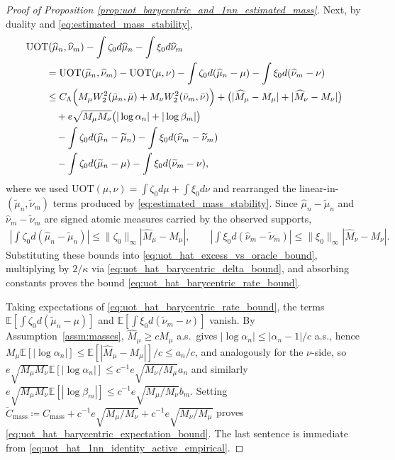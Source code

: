 \documentclass[11pt,reqno]{amsart}
\theoremstyle{definition}
\renewcommand{\hat}{\widehat}
\renewcommand{\tilde}{\widetilde}
\newcommand{\Ep}{\mathbb{E}}
\begin{document}
\begin{proof}[Proof of Proposition \ref{prop:uot_barycentric_and_1nn_estimated_mass}]
Next, by duality and \eqref{eq:estimated_mass_stability},
\begin{align}
\label{eq:uot_hat_excess_vs_oracle_bound}
\begin{aligned}
&\mathrm{UOT}(\hat\mu_n,\hat\nu_m)
- \int \zeta_0   d\hat\mu_n
- \int \xi_0   d\hat\nu_m \\
&\qquad=
\mathrm{UOT}(\hat\mu_n,\hat\nu_m)-\mathrm{UOT}(\mu,\nu)
- \int \zeta_0   d(\hat\mu_n-\mu)
- \int \xi_0   d(\hat\nu_m-\nu) \\
&\qquad\le
C_\Lambda\Bigl(
    M_\mu W_2^2(\bar\mu_n,\bar\mu)+M_\nu W_2^2(\bar\nu_m,\bar\nu)
\Bigr)
+ \bigl( |\hat M_\mu-M_\mu|+|\hat M_\nu-M_\nu| \bigr) \\
&\qquad\quad
+ e\sqrt{M_\mu M_\nu}\bigl(|\log\alpha_n|+|\log\beta_m|\bigr) \\
&\qquad\quad
- \int \zeta_0   d(\hat\mu_n-\tilde\mu_n)
- \int \xi_0   d(\hat\nu_m-\tilde\nu_m) \\
&\qquad\quad
- \int \zeta_0   d(\tilde\mu_n-\mu)
- \int \xi_0   d(\tilde\nu_m-\nu),
\end{aligned}
\end{align}
where we used $\mathrm{UOT}(\mu,\nu)=\int\zeta_0 d\mu+\int\xi_0 d\nu$ and rearranged the linear-in-$(\tilde\mu_n,\tilde\nu_m)$ terms produced by \eqref{eq:estimated_mass_stability}.
Since $\hat\mu_n-\tilde\mu_n$ and $\hat\nu_m-\tilde\nu_m$ are signed atomic measures carried by the observed supports,
\begin{align}
    \left|
        \int \zeta_0   d(\hat\mu_n-\tilde\mu_n)
    \right|
    \le
    \|\zeta_0\|_\infty |\hat M_\mu-M_\mu|,
    \qquad
    \left|
        \int \xi_0   d(\hat\nu_m-\tilde\nu_m)
    \right|
    \le
    \|\xi_0\|_\infty |\hat M_\nu-M_\nu|.
\end{align}
Substituting these bounds into \eqref{eq:uot_hat_excess_vs_oracle_bound}, multiplying by $2/\kappa$ via \eqref{eq:uot_hat_barycentric_delta_bound}, and absorbing constants proves the bound \eqref{eq:uot_hat_barycentric_rate_bound}.

Taking expectations of \eqref{eq:uot_hat_barycentric_rate_bound}, the terms $\Ep[\int\zeta_0 d(\tilde\mu_n-\mu)]$ and $\Ep[\int\xi_0 d(\tilde\nu_m-\nu)]$ vanish. By Assumption~\ref{assm:masses}, $\hat M_\mu\ge cM_\mu$ a.s.\ gives $|\log\alpha_n|\le|\alpha_n-1|/c$ a.s., hence $M_\mu\Ep[|\log\alpha_n|]\le \Ep[|\hat M_\mu-M_\mu|]/c\le a_n/c$, and analogously for the $\nu$-side, so
\(
e\sqrt{M_\mu M_\nu} \Ep[|\log\alpha_n|]\le c^{-1}e\sqrt{M_\nu/M_\mu} a_n
\)
and similarly $e\sqrt{M_\mu M_\nu}\Ep[|\log\beta_m|]\le c^{-1}e\sqrt{M_\mu/M_\nu} b_m$.
Setting $\widetilde C_{\mathrm{mass}}\coloneqq C_{\mathrm{mass}}+c^{-1}e\sqrt{M_\mu/M_\nu}+c^{-1}e\sqrt{M_\nu/M_\mu}$ proves \eqref{eq:uot_hat_barycentric_expectation_bound}.
The last sentence is immediate from \eqref{eq:uot_hat_1nn_identity_active_empirical}.
\end{proof}
\end{document}

